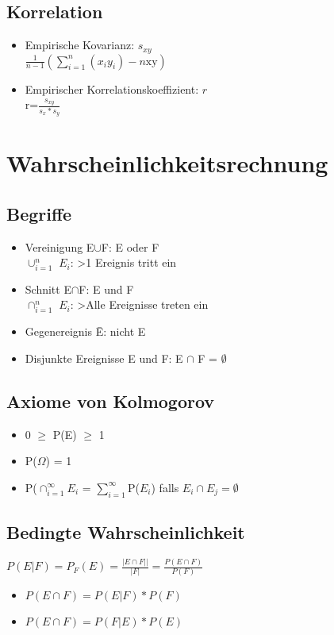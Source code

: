 \documentclass[10pt,landscape,a4paper]{article}
\begin{document}
\begin{multicols}{3}
\subsection{Korrelation}
\begin{itemize}
	\item Empirische Kovarianz: $s_{xy}$ \\
		$\tfrac{1}{n-1} (\sum\limits_{i=1}^{n} (x_i y_i) - n{\text{\={x}\={y}}})$
	\item Empirischer Korrelationskoeffizient: $r$ \\
		r=$\tfrac{s_{xy}}{s_x*s_y}$
\end{itemize}

\section{Wahrscheinlichkeitsrechnung}
\subsection{Begriffe}
\begin{itemize}
	\item Vereinigung E$\cup$F: E oder F \\
		$\cup_{i=1}^n$ $E_i$: >1 Ereignis tritt ein
	\item Schnitt E$\cap$F: E und F \\
		$\cap_{i=1}^n$ $E_i$: >Alle Ereignisse treten ein
	\item Gegenereignis \={E}: nicht E
	\item Disjunkte Ereignisse E und F: E $\cap$ F = $\emptyset$ 
\end{itemize}

\subsection{Axiome von Kolmogorov}
\begin{itemize}
	\item 0 $\geq$ P(E) $\geq$ 1
	\item P($\Omega$) = 1
	\item P($\cap_{i=1}^{\infty}E_i$ = $\sum_{i=1}^{\infty}$P($E_i$) falls $E_i \cap E_j = \emptyset$
\end{itemize}

\subsection{Bedingte Wahrscheinlichkeit}
$P(E|F) = P_F(E) = \frac{|E \cap F||}{|F|} = \frac{P(E \cap F)}{P(F)}$
\begin{itemize}
	\item $P(E \cap F) = P(E|F) * P(F)$
	\item $P(E \cap F) = P(F|E) * P(E)$
\end{itemize}


\end{multicols}
\end{document}
